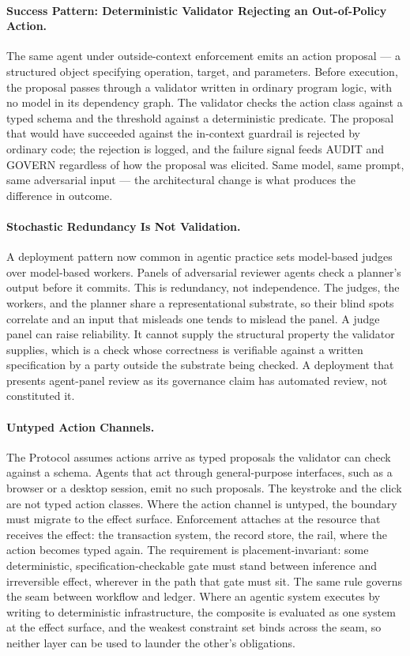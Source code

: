 \documentclass{article}
\theoremstyle{definition}
\begin{document}
\paragraph{Success Pattern: Deterministic Validator Rejecting an Out-of-Policy Action.} The same agent under outside-context enforcement emits an action proposal --- a structured object specifying operation, target, and parameters. Before execution, the proposal passes through a validator written in ordinary program logic, with no model in its dependency graph. The validator checks the action class against a typed schema and the threshold against a deterministic predicate. The proposal that would have succeeded against the in-context guardrail is rejected by ordinary code; the rejection is logged, and the failure signal feeds AUDIT and GOVERN regardless of how the proposal was elicited. Same model, same prompt, same adversarial input --- the architectural change is what produces the difference in outcome.

\paragraph{Stochastic Redundancy Is Not Validation.} A deployment pattern now common in agentic practice sets model-based judges over model-based workers. Panels of adversarial reviewer agents check a planner's output before it commits. This is redundancy, not independence. The judges, the workers, and the planner share a representational substrate, so their blind spots correlate and an input that misleads one tends to mislead the panel. A judge panel can raise reliability. It cannot supply the structural property the validator supplies, which is a check whose correctness is verifiable against a written specification by a party outside the substrate being checked. A deployment that presents agent-panel review as its governance claim has automated review, not constituted it.

\paragraph{Untyped Action Channels.} The Protocol assumes actions arrive as typed proposals the validator can check against a schema. Agents that act through general-purpose interfaces, such as a browser or a desktop session, emit no such proposals. The keystroke and the click are not typed action classes. Where the action channel is untyped, the boundary must migrate to the effect surface. Enforcement attaches at the resource that receives the effect: the transaction system, the record store, the rail, where the action becomes typed again. The requirement is placement-invariant: some deterministic, specification-checkable gate must stand between inference and irreversible effect, wherever in the path that gate must sit. The same rule governs the seam between workflow and ledger. Where an agentic system executes by writing to deterministic infrastructure, the composite is evaluated as one system at the effect surface, and the weakest constraint set binds across the seam, so neither layer can be used to launder the other's obligations.
\end{document}
